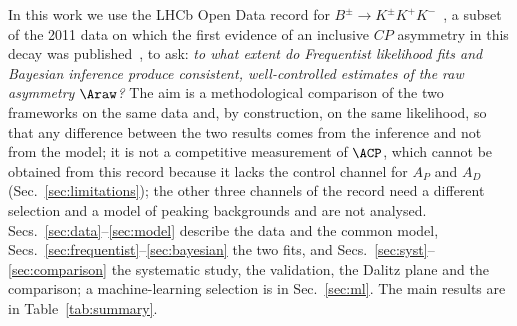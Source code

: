 In this work we use the LHCb Open Data record for $B^{\pm}\to K^{\pm}K^{+}K^{-}$~\cite{opendata_record,opendata_notebook}, a subset of the 2011 data on which the first evidence of an inclusive $CP$ asymmetry in this decay was published~\cite{lhcb_cpv_2013}, to ask: \emph{to what extent do Frequentist likelihood fits and Bayesian inference produce consistent, well-controlled estimates of the raw asymmetry $\Araw$?} The aim is a methodological comparison of the two frameworks on the same data and, by construction, on the same likelihood, so that any difference between the two results comes from the inference and not from the model; it is not a competitive measurement of $\ACP$, which cannot be obtained from this record because it lacks the control channel for $A_P$ and $A_D$ (Sec.~\ref{sec:limitations}); the other three channels of the record need a different selection and a model of peaking backgrounds and are not analysed. Secs.~\ref{sec:data}--\ref{sec:model} describe the data and the common model, Secs.~\ref{sec:frequentist}--\ref{sec:bayesian} the two fits, and Secs.~\ref{sec:syst}--\ref{sec:comparison} the systematic study, the validation, the Dalitz plane and the comparison; a machine-learning selection is in Sec.~\ref{sec:ml}. The main results are in Table~\ref{tab:summary}.


